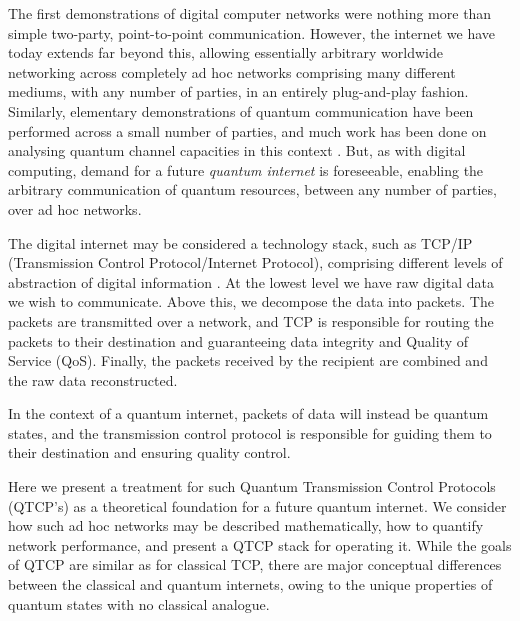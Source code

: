 \documentclass[aps,rmp,twocolumn,amsmath,amssymb,nofootinbib,superscriptaddress]{revtex4}
\newcommand{\peter}[1]{{\color{Aquamarine}{#1}}}
\begin{document}
The first demonstrations of digital computer networks were nothing more than simple two-party, point-to-point communication. However, the internet we have today extends far beyond this, allowing essentially arbitrary worldwide networking across completely ad hoc networks comprising many different mediums, with any number of parties, in an entirely plug-and-play fashion. Similarly, elementary demonstrations of quantum communication have been performed across a small number of parties, and much work has been done on analysing quantum channel capacities in this context \cite{??? channel_capacity}. But, as with digital computing, demand for a future \emph{quantum internet} is foreseeable, enabling the arbitrary communication of quantum resources, between any number of parties, over ad hoc networks.

The digital internet may be considered a technology stack, such as TCP/IP (Transmission Control Protocol/Internet Protocol), comprising different levels of abstraction of digital information \cite{textbookOnNetworking}. At the lowest level we have raw digital data we wish to communicate. Above this, we decompose the data into packets. The packets are transmitted over a network, and TCP is responsible for routing the packets to their destination and guaranteeing data integrity and Quality of Service ({\sc QoS}). Finally, the packets received by the recipient are combined and the raw data reconstructed.

\peter{The TCP layer remains largely transparent to the end-user, enabling virtual software interfaces to remote digital assets that behave as though they were local. This allows high-level services such as the File Transfer Protocol (FTP), the worldwide web, video and audio streaming, and outsourced computation on supercomputers, as though everything was taking place locally, with the end-user oblivious to the underlying networking protocols. To the user, YouTube videos or Spotify tracks behave as though they were held as local copies. And FTP allows storage on a data centre to be mounted as though it were a local volume. We foresee a demand for these same criteria in the quantum era.}

In the context of a quantum internet, packets of data will instead be quantum states, and the transmission control protocol is responsible for guiding them to their destination and ensuring quality control.

Here we present a treatment for such Quantum Transmission Control Protocols (QTCP's) as a theoretical foundation for a future quantum internet. We consider how such ad hoc networks may be described mathematically, how to quantify network performance, and present a QTCP stack for operating it. While the goals of QTCP are similar as for classical TCP, there are major conceptual differences between the classical and quantum internets, owing to the unique properties of quantum states with no classical analogue.
\end{document}
